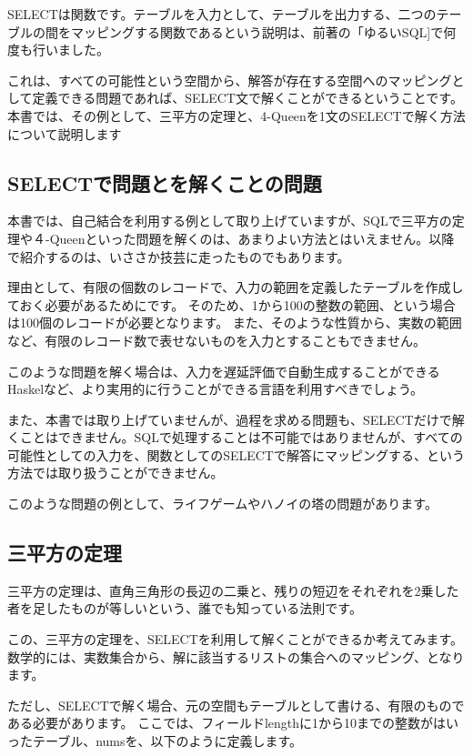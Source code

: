 SELECTは関数です。テーブルを入力として、テーブルを出力する、二つのテーブルの間をマッピングする関数であるという説明は、前著の「ゆるいSQL]で何度も行いました。

これは、すべての可能性という空間から、解答が存在する空間へのマッピングとして定義できる問題であれば、SELECT文で解くことができるということです。
本書では、その例として、三平方の定理と、4-Queenを1文のSELECTで解く方法について説明します

\subsection{SELECTで問題とを解くことの問題}

本書では、自己結合を利用する例として取り上げていますが、SQLで三平方の定理や４-Queenといった問題を解くのは、あまりよい方法とはいえません。以降で紹介するのは、いささか技芸に走ったものでもあります。

理由として、有限の個数のレコードで、入力の範囲を定義したテーブルを作成しておく必要があるためにです。
そのため、1から100の整数の範囲、という場合は100個のレコードが必要となります。
また、そのような性質から、実数の範囲など、有限のレコード数で表せないものを入力とすることもできません。

このような問題を解く場合は、入力を遅延評価で自動生成することができるHaskelなど、より実用的に行うことができる言語を利用すべきでしょう。

また、本書では取り上げていませんが、過程を求める問題も、SELECTだけで解くことはできません。SQLで処理することは不可能ではありませんが、すべての可能性としての入力を、関数としてのSELECTで解答にマッピングする、という方法では取り扱うことができません。

このような問題の例として、ライフゲームやハノイの塔の問題があります。

\subsection{三平方の定理}

三平方の定理は、直角三角形の長辺の二乗と、残りの短辺をそれぞれを2乗した者を足したものが等しいという、誰でも知っている法則です。

この、三平方の定理を、SELECTを利用して解くことができるか考えてみます。
数学的には、実数集合から、解に該当するリストの集合へのマッピング、となります。

ただし、SELECTで解く場合、元の空間もテーブルとして書ける、有限のものである必要があります。
ここでは、フィールドlengthに1から10までの整数がはいったテーブル、numsを、以下のように定義します。

